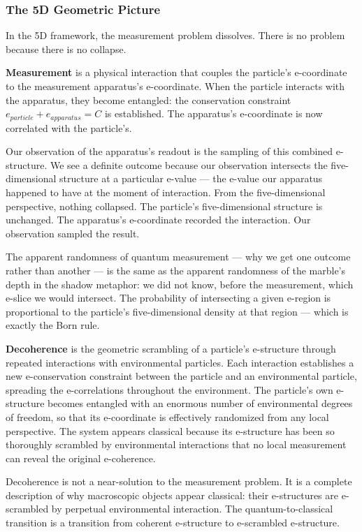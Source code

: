 \documentclass[aps,prd,preprint,superscriptaddress,longbibliography,floatfix]{revtex4-2}
\theoremstyle{remark}
\begin{document}
\subsubsection{The 5D Geometric Picture}

In the 5D framework, the measurement problem dissolves. There is no problem because there is no collapse.

\textbf{Measurement} is a physical interaction that couples the particle's e-coordinate to the measurement apparatus's e-coordinate. When the particle interacts with the apparatus, they become entangled: the conservation constraint $e_{particle} + e_{apparatus} = C$ is established. The apparatus's e-coordinate is now correlated with the particle's.

Our observation of the apparatus's readout is the sampling of this combined e-structure. We see a definite outcome because our observation intersects the five-dimensional structure at a particular e-value --- the e-value our apparatus happened to have at the moment of interaction. From the five-dimensional perspective, nothing collapsed. The particle's five-dimensional structure is unchanged. The apparatus's e-coordinate recorded the interaction. Our observation sampled the result.

The apparent randomness of quantum measurement --- why we get one outcome rather than another --- is the same as the apparent randomness of the marble's depth in the shadow metaphor: we did not know, before the measurement, which e-slice we would intersect. The probability of intersecting a given e-region is proportional to the particle's five-dimensional density at that region --- which is exactly the Born rule.

\textbf{Decoherence} is the geometric scrambling of a particle's e-structure through repeated interactions with environmental particles. Each interaction establishes a new e-conservation constraint between the particle and an environmental particle, spreading the e-correlations throughout the environment. The particle's own e-structure becomes entangled with an enormous number of environmental degrees of freedom, so that its e-coordinate is effectively randomized from any local perspective. The system appears classical because its e-structure has been so thoroughly scrambled by environmental interactions that no local measurement can reveal the original e-coherence.

Decoherence is not a near-solution to the measurement problem. It is a complete description of why macroscopic objects appear classical: their e-structures are e-scrambled by perpetual environmental interaction. The quantum-to-classical transition is a transition from coherent e-structure to e-scrambled e-structure.
\end{document}
